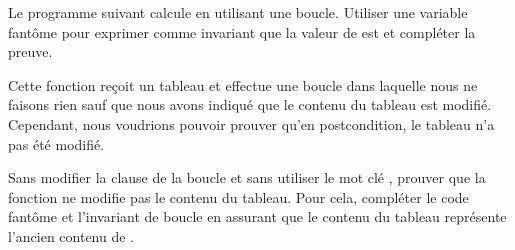 



Le programme suivant calcule  en utilisant une boucle.
Utiliser une variable fantôme  pour exprimer comme invariant que
la valeur de  est  et compléter la preuve.






Cette fonction reçoit un tableau et effectue une boucle dans laquelle nous ne
faisons rien sauf que nous avons indiqué que le contenu du tableau est modifié.
Cependant, nous voudrions pouvoir prouver qu'en postcondition, le tableau n'a
pas été modifié.




Sans modifier la clause  de la boucle et sans utiliser le mot
clé , prouver que la fonction ne modifie pas le
contenu du tableau. Pour cela, compléter le code fantôme et l'invariant de boucle
en assurant que le contenu du tableau  représente l'ancien contenu
de .
